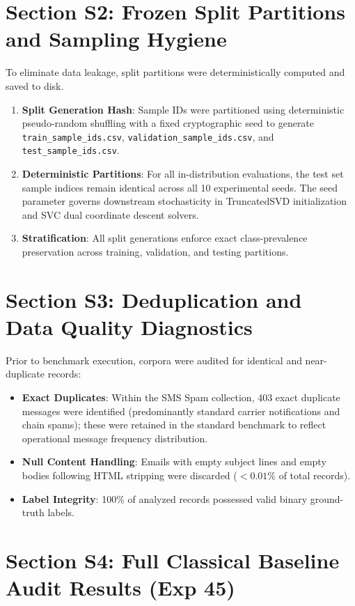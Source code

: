 \documentclass[10pt,letterpaper]{article}
\begin{document}
\section{Section S2: Frozen Split Partitions and Sampling Hygiene}
\label{sec:supp_splits}

To eliminate data leakage, split partitions were deterministically computed and saved to disk.
\begin{enumerate}
    \item \textbf{Split Generation Hash}: Sample IDs were partitioned using deterministic pseudo-random shuffling with a fixed cryptographic seed to generate \texttt{train\_sample\_ids.csv}, \texttt{validation\_sample\_ids.csv}, and \texttt{test\_sample\_ids.csv}.
    \item \textbf{Deterministic Partitions}: For all in-distribution evaluations, the test set sample indices remain identical across all 10 experimental seeds. The seed parameter governs downstream stochasticity in TruncatedSVD initialization and SVC dual coordinate descent solvers.
    \item \textbf{Stratification}: All split generations enforce exact class-prevalence preservation across training, validation, and testing partitions.
\end{enumerate}

\section{Section S3: Deduplication and Data Quality Diagnostics}
\label{sec:supp_dedup}

Prior to benchmark execution, corpora were audited for identical and near-duplicate records:
\begin{itemize}
    \item \textbf{Exact Duplicates}: Within the SMS Spam collection, 403 exact duplicate messages were identified (predominantly standard carrier notifications and chain spams); these were retained in the standard benchmark to reflect operational message frequency distribution.
    \item \textbf{Null Content Handling}: Emails with empty subject lines and empty bodies following HTML stripping were discarded ($<0.01\%$ of total records).
    \item \textbf{Label Integrity}: 100\% of analyzed records possessed valid binary ground-truth labels.
\end{itemize}

\section{Section S4: Full Classical Baseline Audit Results (Exp 45)}
\label{sec:supp_baselines}
\end{document}
